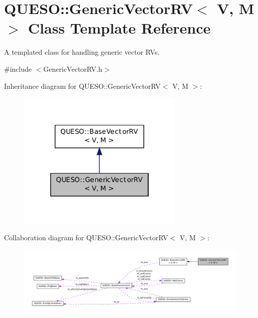 \hypertarget{class_q_u_e_s_o_1_1_generic_vector_r_v}{\section{Q\-U\-E\-S\-O\-:\-:Generic\-Vector\-R\-V$<$ V, M $>$ Class Template Reference}
\label{class_q_u_e_s_o_1_1_generic_vector_r_v}
}


A templated class for handling generic vector R\-Vs.  




{\ttfamily \#include $<$Generic\-Vector\-R\-V.\-h$>$}



Inheritance diagram for Q\-U\-E\-S\-O\-:\-:Generic\-Vector\-R\-V$<$ V, M $>$\-:
\nopagebreak
\begin{figure}[H]
\begin{center}
\leavevmode
\includegraphics[width=226pt]{class_q_u_e_s_o_1_1_generic_vector_r_v__inherit__graph}
\end{center}
\end{figure}


Collaboration diagram for Q\-U\-E\-S\-O\-:\-:Generic\-Vector\-R\-V$<$ V, M $>$\-:
\nopagebreak
\begin{figure}[H]
\begin{center}
\leavevmode
\includegraphics[width=350pt]{class_q_u_e_s_o_1_1_generic_vector_r_v__coll__graph}
\end{center}
\end{figure}
